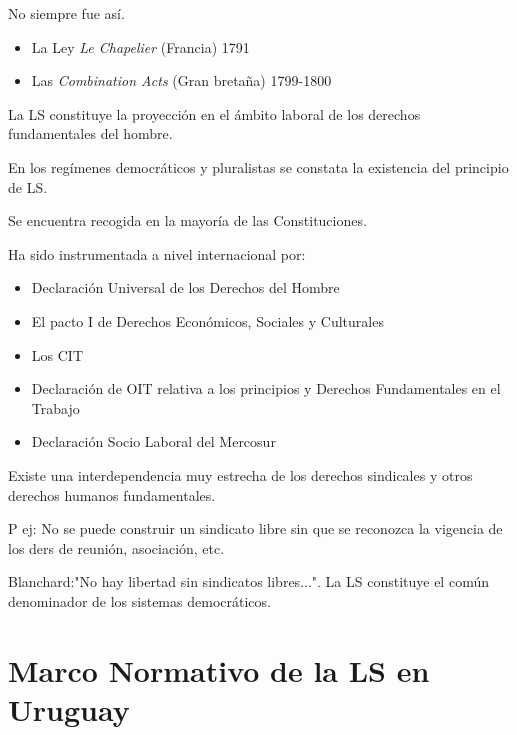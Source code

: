 \documentclass[spanish,12pt,a4paper,titlepage]{report}
\begin{document}
No siempre fue así.
\begin{itemize}
\item La Ley \textit{Le Chapelier} (Francia) 1791
\item Las \textit{Combination Acts} (Gran bretaña) 1799-1800
\end{itemize} 

La LS constituye la proyección en el ámbito laboral de los derechos fundamentales del hombre.

En los regímenes democráticos y pluralistas se constata la existencia del principio de LS.

Se encuentra recogida en la mayoría de las Constituciones.

Ha sido instrumentada a nivel internacional por:

\begin{itemize}
\item Declaración Universal de los Derechos del Hombre
\item El pacto I de Derechos Económicos, Sociales y Culturales
\item Los CIT
\item Declaración de OIT relativa a los principios y Derechos Fundamentales en el Trabajo
\item Declaración Socio Laboral del Mercosur
\end{itemize}

Existe una interdependencia muy estrecha de los derechos sindicales y otros derechos humanos fundamentales. 

P ej: No se puede construir un sindicato libre sin que se reconozca la vigencia de los ders de reunión, asociación, etc.

Blanchard:"No hay libertad sin sindicatos libres...". La LS constituye el común denominador de los sistemas democráticos.
 
\section{Marco Normativo de la LS en Uruguay}
\end{document}
